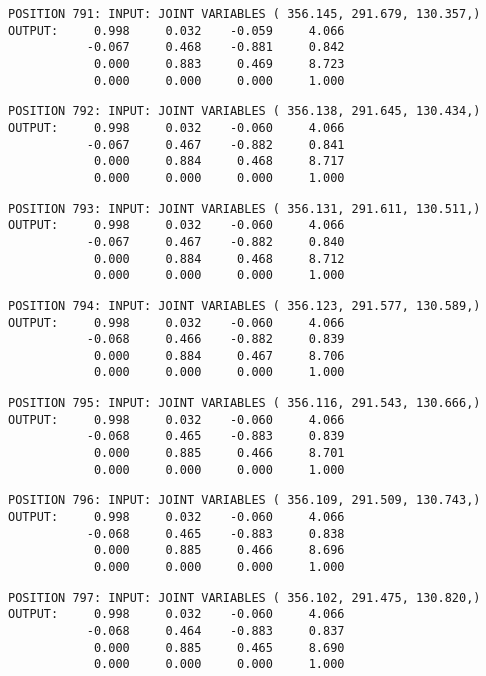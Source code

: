 \begin{verbatim}
POSITION 791: INPUT: JOINT VARIABLES ( 356.145, 291.679, 130.357,)
OUTPUT:     0.998     0.032    -0.059     4.066
           -0.067     0.468    -0.881     0.842
            0.000     0.883     0.469     8.723
            0.000     0.000     0.000     1.000
\end{verbatim} \pagebreak[1]\begin{verbatim}
POSITION 792: INPUT: JOINT VARIABLES ( 356.138, 291.645, 130.434,)
OUTPUT:     0.998     0.032    -0.060     4.066
           -0.067     0.467    -0.882     0.841
            0.000     0.884     0.468     8.717
            0.000     0.000     0.000     1.000
\end{verbatim} \pagebreak[1]\begin{verbatim}
POSITION 793: INPUT: JOINT VARIABLES ( 356.131, 291.611, 130.511,)
OUTPUT:     0.998     0.032    -0.060     4.066
           -0.067     0.467    -0.882     0.840
            0.000     0.884     0.468     8.712
            0.000     0.000     0.000     1.000
\end{verbatim} \pagebreak[1]\begin{verbatim}
POSITION 794: INPUT: JOINT VARIABLES ( 356.123, 291.577, 130.589,)
OUTPUT:     0.998     0.032    -0.060     4.066
           -0.068     0.466    -0.882     0.839
            0.000     0.884     0.467     8.706
            0.000     0.000     0.000     1.000
\end{verbatim} \pagebreak[1]\begin{verbatim}
POSITION 795: INPUT: JOINT VARIABLES ( 356.116, 291.543, 130.666,)
OUTPUT:     0.998     0.032    -0.060     4.066
           -0.068     0.465    -0.883     0.839
            0.000     0.885     0.466     8.701
            0.000     0.000     0.000     1.000
\end{verbatim} \pagebreak[1]\begin{verbatim}
POSITION 796: INPUT: JOINT VARIABLES ( 356.109, 291.509, 130.743,)
OUTPUT:     0.998     0.032    -0.060     4.066
           -0.068     0.465    -0.883     0.838
            0.000     0.885     0.466     8.696
            0.000     0.000     0.000     1.000
\end{verbatim} \pagebreak[1]\begin{verbatim}
POSITION 797: INPUT: JOINT VARIABLES ( 356.102, 291.475, 130.820,)
OUTPUT:     0.998     0.032    -0.060     4.066
           -0.068     0.464    -0.883     0.837
            0.000     0.885     0.465     8.690
            0.000     0.000     0.000     1.000
\end{verbatim} \pagebreak[1]\begin{verbatim}

\end{verbatim}
